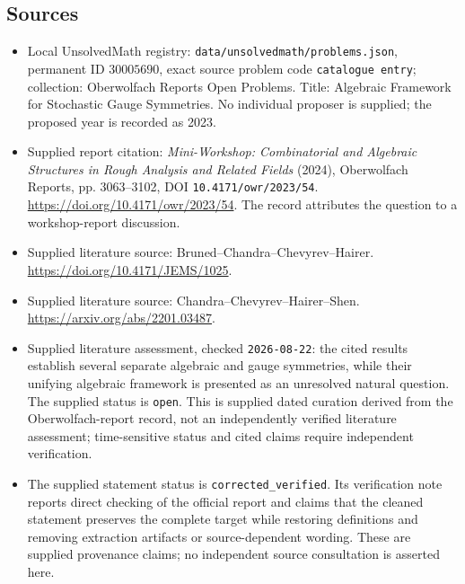 \documentclass[11pt]{article}
\begin{document}
\subsection{Sources}
\begin{itemize}
\item Local UnsolvedMath registry: \texttt{data/unsolvedmath/problems.json}, permanent ID \(30005690\), exact source problem code \texttt{catalogue entry}; collection: Oberwolfach Reports Open Problems. Title: Algebraic Framework for Stochastic Gauge Symmetries. No individual proposer is supplied; the proposed year is recorded as 2023.
\item Supplied report citation: \emph{Mini-Workshop: Combinatorial and Algebraic Structures in Rough Analysis and Related Fields} (2024), Oberwolfach Reports, pp. 3063--3102, DOI \texttt{10.4171/owr/2023/54}. \url{https://doi.org/10.4171/owr/2023/54}. The record attributes the question to a workshop-report discussion.
\item Supplied literature source: Bruned--Chandra--Chevyrev--Hairer. \url{https://doi.org/10.4171/JEMS/1025}.
\item Supplied literature source: Chandra--Chevyrev--Hairer--Shen. \url{https://arxiv.org/abs/2201.03487}.
\item Supplied literature assessment, checked \texttt{2026-08-22}: the cited results establish several separate algebraic and gauge symmetries, while their unifying algebraic framework is presented as an unresolved natural question. The supplied status is \texttt{open}. This is supplied dated curation derived from the Oberwolfach-report record, not an independently verified literature assessment; time-sensitive status and cited claims require independent verification.
\item The supplied statement status is \texttt{corrected\_verified}. Its verification note reports direct checking of the official report and claims that the cleaned statement preserves the complete target while restoring definitions and removing extraction artifacts or source-dependent wording. These are supplied provenance claims; no independent source consultation is asserted here.
\end{itemize}
\end{document}
